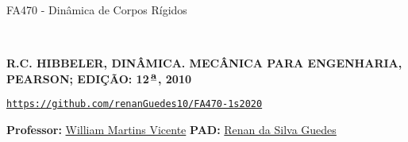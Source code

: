 \begin{center}
	\begin{huge}
		FA470 - Dinâmica de Corpos Rígidos
	\end{huge}\\\vspace{.3cm}
	\begin{large}
		\textbf{R.C. HIBBELER, DINÂMICA. MECÂNICA PARA ENGENHARIA, PEARSON; EDIÇÃO: 12$^{\,\textbf{\underline{\small{a}}}}$, 2010}
		
		\href{https://github.com/renanGuedes10/FA470-1s2020}{\texttt{https://github.com/renanGuedes10/FA470-1s2020}}\\\vspace{.15cm}
	\end{large}	
\end{center}

\hspace{.5cm}
\begin{large}
	\textbf{Professor:} \underline{William Martins Vicente}\hspace{.5cm}
	\large{\textbf{PAD: }\underline{Renan da Silva Guedes}}
\end{large}

\begin{center}
	\\\vspace{.2cm}
\end{center}
